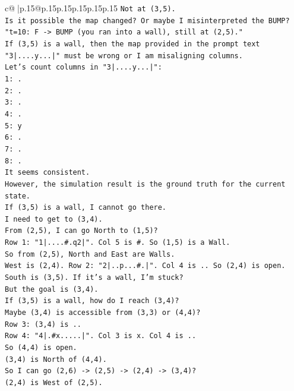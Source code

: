 \documentclass{article}
\begin{document}
{\begin{supertabular}{c@{$\;$}|p{.15\linewidth}@{}p{.15\linewidth}p{.15\linewidth}p{.15\linewidth}p{.15\linewidth}p{.15\linewidth}}
{{{\texttt{Not at (3,5).} \\
\texttt{Is it possible the map changed? Or maybe I misinterpreted the BUMP?} \\
\texttt{"t=10: F {-}> BUMP (you ran into a wall), still at (2,5)."} \\
\texttt{If (3,5) is a wall, then the map provided in the prompt text "3|....y...|" must be wrong or I am misaligning columns.} \\
\texttt{Let's count columns in "3|....y...|":} \\
\texttt{1: .} \\
\texttt{2: .} \\
\texttt{3: .} \\
\texttt{4: .} \\
\texttt{5: y} \\
\texttt{6: .} \\
\texttt{7: .} \\
\texttt{8: .} \\
\texttt{It seems consistent.} \\
\texttt{However, the simulation result is the ground truth for the current state.} \\
\texttt{If (3,5) is a wall, I cannot go there.} \\
\texttt{I need to get to (3,4).} \\
\texttt{From (2,5), I can go North to (1,5)?} \\
\texttt{Row 1: "1|....\#.q2|". Col 5 is \#. So (1,5) is a Wall.} \\
\texttt{So from (2,5), North and East are Walls.} \\
\texttt{West is (2,4). Row 2: "2|..p...\#.|". Col 4 is .. So (2,4) is open.} \\
\texttt{South is (3,5). If it's a wall, I'm stuck?} \\
\texttt{But the goal is (3,4).} \\
\texttt{If (3,5) is a wall, how do I reach (3,4)?} \\
\texttt{Maybe (3,4) is accessible from (3,3) or (4,4)?} \\
\texttt{Row 3: (3,4) is ..} \\
\texttt{Row 4: "4|.\#x.....|". Col 3 is x. Col 4 is ..} \\
\texttt{So (4,4) is open.} \\
\texttt{(3,4) is North of (4,4).} \\
\texttt{So I can go (2,6) {-}> (2,5) {-}> (2,4) {-}> (3,4)?} \\
\texttt{(2,4) is West of (2,5).} \\
}}}
\end{supertabular}}
\end{document}
